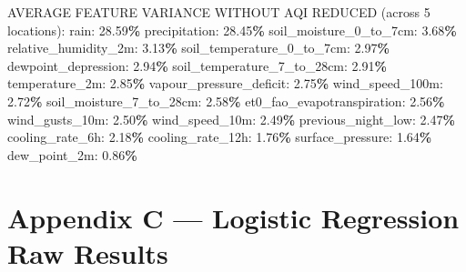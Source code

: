 \documentclass[
  letterpaper,
  DIV=11,
  numbers=noendperiod]{scrartcl}
\newenvironment{Shaded}{\begin{snugshade}}{\end{snugshade}}
\newcommand{\DecValTok}[1]{\textcolor[rgb]{0.00,0.00,0.81}{#1}}
\newcommand{\FloatTok}[1]{\textcolor[rgb]{0.00,0.00,0.81}{#1}}
\newcommand{\NormalTok}[1]{#1}
\newcommand{\OperatorTok}[1]{\textcolor[rgb]{0.81,0.36,0.00}{\textbf{#1}}}
\begin{document}
\begin{Shaded}
\begin{Highlighting}[]
\NormalTok{AVERAGE FEATURE VARIANCE WITHOUT AQI REDUCED (across }\DecValTok{5}\NormalTok{ locations):}
\NormalTok{  rain: }\FloatTok{28.59}\OperatorTok{\%}
\NormalTok{  precipitation: }\FloatTok{28.45}\OperatorTok{\%}
\NormalTok{  soil\_moisture\_0\_to\_7cm: }\FloatTok{3.68}\OperatorTok{\%}
\NormalTok{  relative\_humidity\_2m: }\FloatTok{3.13}\OperatorTok{\%}
\NormalTok{  soil\_temperature\_0\_to\_7cm: }\FloatTok{2.97}\OperatorTok{\%}
\NormalTok{  dewpoint\_depression: }\FloatTok{2.94}\OperatorTok{\%}
\NormalTok{  soil\_temperature\_7\_to\_28cm: }\FloatTok{2.91}\OperatorTok{\%}
\NormalTok{  temperature\_2m: }\FloatTok{2.85}\OperatorTok{\%}
\NormalTok{  vapour\_pressure\_deficit: }\FloatTok{2.75}\OperatorTok{\%}
\NormalTok{  wind\_speed\_100m: }\FloatTok{2.72}\OperatorTok{\%}
\NormalTok{  soil\_moisture\_7\_to\_28cm: }\FloatTok{2.58}\OperatorTok{\%}
\NormalTok{  et0\_fao\_evapotranspiration: }\FloatTok{2.56}\OperatorTok{\%}
\NormalTok{  wind\_gusts\_10m: }\FloatTok{2.50}\OperatorTok{\%}
\NormalTok{  wind\_speed\_10m: }\FloatTok{2.49}\OperatorTok{\%}
\NormalTok{  previous\_night\_low: }\FloatTok{2.47}\OperatorTok{\%}
\NormalTok{  cooling\_rate\_6h: }\FloatTok{2.18}\OperatorTok{\%}
\NormalTok{  cooling\_rate\_12h: }\FloatTok{1.76}\OperatorTok{\%}
\NormalTok{  surface\_pressure: }\FloatTok{1.64}\OperatorTok{\%}
\NormalTok{  dew\_point\_2m: }\FloatTok{0.86}\OperatorTok{\%}
\end{Highlighting}
\end{Shaded}

\section{Appendix C --- Logistic Regression Raw
Results}\label{appendix-c-logistic-regression-raw-results}
\end{document}
